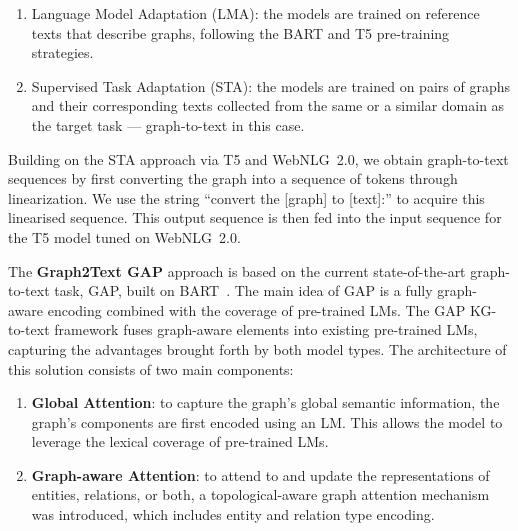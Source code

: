 \begin{enumerate}
    \item Language Model Adaptation (LMA): the models are trained on reference texts that describe graphs, following the BART and T5 pre-training strategies.
    \item Supervised Task Adaptation (STA): the models are trained on pairs of graphs and their corresponding texts collected from the same or a similar domain as the target task --- graph-to-text in this case. 
\end{enumerate}

Building on the STA approach via T5 and WebNLG~2.0, we obtain graph-to-text sequences by first converting the graph into a sequence of tokens through linearization. We use the string ``convert the [graph] to [text]:'' to acquire this linearised sequence. This output sequence is then fed into the input sequence for the T5 model tuned on WebNLG~2.0. 

The \textbf{Graph2Text GAP} approach is based on the current state-of-the-art graph-to-text task, GAP, built on BART~\cite{DBLP:conf/coling/ColasAW22-GAP}. 
The main idea of GAP is a fully graph-aware encoding combined with the coverage of pre-trained LMs. The GAP KG-to-text framework fuses graph-aware elements into existing pre-trained LMs, capturing the advantages brought forth by both model types. The architecture of this solution consists of two main components:

\begin{enumerate}
\item \textbf{Global Attention}: to capture the graph's global semantic information, the graph’s components are first encoded using an LM. This allows the model to leverage the lexical coverage of pre-trained LMs.
\item \textbf{Graph-aware Attention}: to attend to and update the representations of entities, relations, or both, a topological-aware graph attention mechanism was introduced, which includes entity and relation type encoding.
\end{enumerate}

